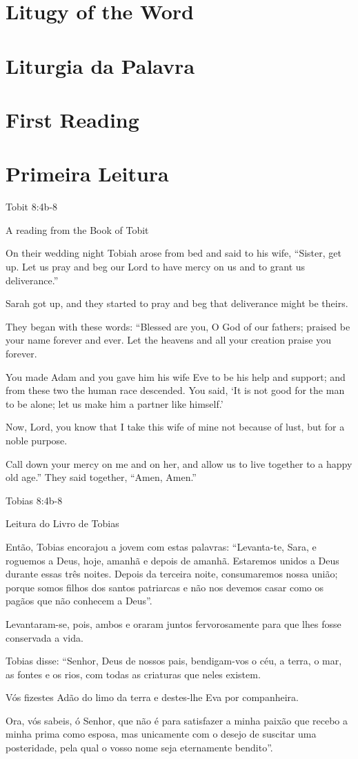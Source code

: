 \documentclass[10pt,a5]{article}
\newcommand \sect[2] {\section*{#1} \switchcolumn \section*{#2} \switchcolumn*}
\begin{document}
\begin{paracol}{2}

 \sect{Litugy of the Word}{Liturgia da Palavra}

 \sect{First Reading}{Primeira Leitura}

Tobit 8:4b-8

A reading from the Book of Tobit

On their wedding night Tobiah arose from bed and said to his wife,
“Sister, get up. Let us pray and beg our Lord to have mercy on
us and to grant us deliverance.”

Sarah got up, and they started to pray
and beg that deliverance might be theirs.

They began with these words:
“Blessed are you, O God of our fathers;
praised be your name forever and ever.
Let the heavens and all your creation
praise you forever.

You made Adam and you gave him his wife Eve to be his help
and support;
and from these two the human race descended.
You said, ‘It is not good for the man to be alone;
let us make him a partner like himself.’

Now, Lord, you know that I take this wife of mine not because
of lust,
but for a noble purpose.

Call down your mercy on me and on her,
and allow us to live together to a happy old age.”
They said together, “Amen, Amen.”


\switchcolumn

Tobias 8:4b-8

Leitura do Livro de Tobias

Então, Tobias encorajou a jovem com estas palavras: “Levanta-te, Sara, e roguemos a Deus, hoje, amanhã e depois de amanhã. Estaremos unidos a Deus durante essas três noites. Depois da terceira noite, consumaremos nossa união;
porque somos filhos dos santos patriarcas e não nos devemos casar como os pagãos que não conhecem a Deus”.

Levantaram-se, pois, ambos e oraram juntos fervorosamente para que lhes fosse conservada a vida.

Tobias disse: “Senhor, Deus de nossos pais, bendigam-vos o céu, a terra, o mar, as fontes e os rios, com todas as criaturas que neles existem.

Vós fizestes Adão do limo da terra e destes-lhe Eva por companheira.

Ora, vós sa­beis, ó Senhor, que não é para satisfazer a minha paixão que recebo a minha prima como esposa, mas unicamente com o desejo de suscitar uma posteridade, pela qual o vosso nome seja eternamente bendito”.


\end{paracol}
\end{document}
